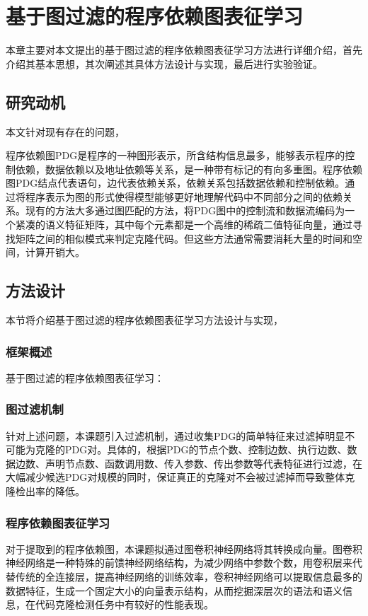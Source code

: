 \chapter{基于图过滤的程序依赖图表征学习}
本章主要对本文提出的基于图过滤的程序依赖图表征学习方法进行详细介绍，首先介绍其基本思想，其次阐述其具体方法设计与实现，最后进行实验验证。
\section{研究动机}
本文针对现有存在的问题，

程序依赖图PDG是程序的一种图形表示，所含结构信息最多，能够表示程序的控制依赖，数据依赖以及地址依赖等关系，是一种带有标记的有向多重图。程序依赖图PDG结点代表语句，边代表依赖关系，依赖关系包括数据依赖和控制依赖。通过将程序表示为图的形式使得模型能够更好地理解代码中不同部分之间的依赖关系。现有的方法大多通过图匹配的方法，将PDG图中的控制流和数据流编码为一个紧凑的语义特征矩阵，其中每个元素都是一个高维的稀疏二值特征向量，通过寻找矩阵之间的相似模式来判定克隆代码。但这些方法通常需要消耗大量的时间和空间，计算开销大。
\section{方法设计}
本节将介绍基于图过滤的程序依赖图表征学习方法设计与实现， 

\subsection{框架概述}
基于图过滤的程序依赖图表征学习：

\subsection{图过滤机制}
针对上述问题，本课题引入过滤机制，通过收集PDG的简单特征来过滤掉明显不可能为克隆的PDG对。具体的，根据PDG的节点个数、控制边数、执行边数、数据边数、声明节点数、函数调用数、传入参数、传出参数等代表特征进行过滤，在大幅减少候选PDG对规模的同时，保证真正的克隆对不会被过滤掉而导致整体克隆检出率的降低。

\subsection{程序依赖图表征学习}
对于提取到的程序依赖图，本课题拟通过图卷积神经网络将其转换成向量。图卷积神经网络是一种特殊的前馈神经网络结构，为减少网络中参数个数，用卷积层来代替传统的全连接层，提高神经网络的训练效率，卷积神经网络可以提取信息最多的数据特征，生成一个固定大小的向量表示结构，从而挖掘深层次的语法和语义信息，在代码克隆检测任务中有较好的性能表现。
